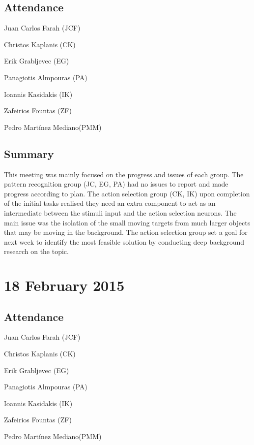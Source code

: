 \documentclass[a4paper,11pt]{article}
\begin{document}
\subsection*{Attendance}
\begin{compactenum}
\item Juan Carlos Farah (JCF)
\item Christos Kaplanis (CK)
\item Erik Grabljevec (EG)
\item Panagiotis Almpouras (PA)
\item Ioannis Kasidakis (IK)
\item Zafeirios Fountas (ZF)
\item Pedro Martínez Mediano(PMM)
\end{compactenum}

\subsection*{Summary}
This meeting was mainly focused on the progress and issues of each group. The pattern recognition group (JC, EG, PA) had no issues to report and made progress according to plan. The action selection group (CK, IK) upon completion of the initial tasks realised they need an extra component to act as an intermediate between the stimuli input and the action selection neurons. The main issue was the isolation of the small moving targets from much larger objects that may be moving in the background. The action selection group set a goal for next week to identify the most feasible solution by conducting deep background research on the topic.

\maketitle
\section*{18 February 2015}
\subsection*{Attendance}
\begin{compactenum}
\item Juan Carlos Farah (JCF)
\item Christos Kaplanis (CK)
\item Erik Grabljevec (EG)
\item Panagiotis Almpouras (PA)
\item Ioannis Kasidakis (IK)
\item Zafeirios Fountas (ZF)
\item Pedro Martínez Mediano(PMM)
\end{compactenum}
\end{document}
